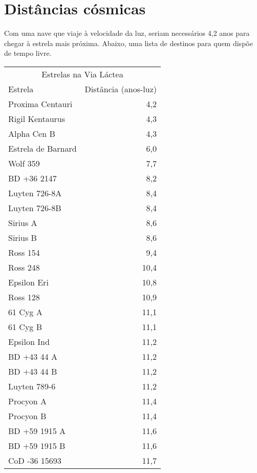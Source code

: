 \documentclass[a4paper,oneside]{article}
\begin{document}
\section{Distâncias cósmicas}

Com uma nave que viaje à velocidade da luz, seriam necessários 4,2 anos para
chegar à estrela mais próxima. Abaixo, uma lista de destinos para quem dispõe
de tempo livre.

\begin{center}
  \begin{tabular}{lr}
    \multicolumn{2}{c}{Estrelas na Via Láctea}\\[8pt]
    Estrela            & Distância (anos-luz)\\[5pt]
    Proxima Centauri   & 4,2\\
    Rigil Kentaurus    & 4,3\\
    Alpha Cen B        & 4,3\\
    Estrela de Barnard & 6,0\\
    Wolf 359           & 7,7\\
    BD +36 2147        & 8,2\\
    Luyten 726-8A      & 8,4\\
    Luyten 726-8B      & 8,4\\
    Sirius A           & 8,6\\
    Sirius B           & 8,6\\
    Ross 154           & 9,4\\
    Ross 248           & 10,4\\
    Epsilon Eri        & 10,8\\
    Ross 128           & 10,9\\
    61 Cyg A           & 11,1\\
    61 Cyg B           & 11,1\\
    Epsilon Ind        & 11,2\\
    BD +43 44 A        & 11,2\\
    BD +43 44 B        & 11,2\\
    Luyten 789-6       & 11,2\\
    Procyon A          & 11,4\\
    Procyon B          & 11,4\\
    BD +59 1915 A      & 11,6\\
    BD +59 1915 B      & 11,6\\
    CoD -36 15693      & 11,7
  \end{tabular}
\end{center}
\end{document}
